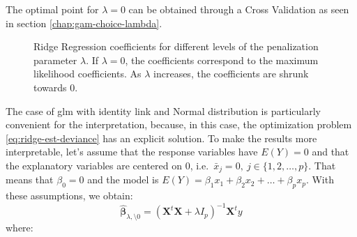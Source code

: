 \documentclass[a4paper, twoside, openright, 12pt]{report}
\theoremstyle{definition}
\theoremstyle{definition}
\theoremstyle{definition}
\theoremstyle{remark}
\begin{document}
The optimal point for \(\lambda=0\) can be obtained through a Cross Validation as seen in section \ref{chap:gam-choice-lambda}.







\begin{figure}[!hbtp]

{\centering {}\newline{}\newline{}

}

\caption[The Bias-Variance trade off. Ridge Regression coefficients for different levels of the penalization parameter \(\lambda\).]{Ridge Regression coefficients for different levels of the penalization parameter \(\lambda\). If \(\lambda=0\), the coefficients correspond to the maximum likelihood coefficients. As \(\lambda\) increases, the coefficients are shrunk towards \(0\).}\label{fig:ridge-lambda}
\end{figure}

The case of \ac{glm} with identity link and Normal distribution is particularly convenient for the interpretation, because, in this case, the optimization problem \eqref{eq:ridge-est-deviance} has an explicit solution. To make the results more interpretable, let's assume that the response variables have \(E(Y)=0\) and that the explanatory variables are centered on \(0\), i.e.~\(\bar{x}_j=0, \ j\in\{1,2,\dots,p\}\). That means that \(\beta_0=0\) and the model is \(E(Y)=\beta_1x_1+\beta_2x_2+\dots+\beta_px_p\). With these assumptions, we obtain:
\begin{equation}
\label{eq:ridge-estimator}
\hat{\boldsymbol{\beta}}_{\lambda,\setminus0} = \left(\boldsymbol{X}^t\boldsymbol{X}+\lambda I_p\right)^{-1}\boldsymbol{X}^t y
\end{equation}
where:
\end{document}
